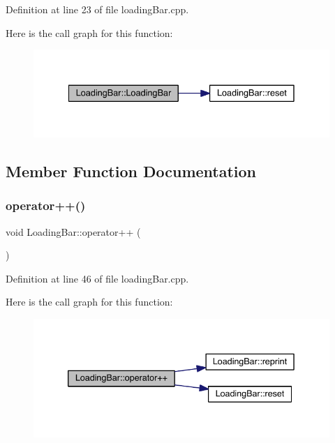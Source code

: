 Definition at line 23 of file loading\+Bar.\+cpp.

Here is the call graph for this function\+:\nopagebreak
\begin{figure}[H]
\begin{center}
\leavevmode
\includegraphics[width=335pt]{class_loading_bar_a0afe1dd48a942d6c5e55d7dfe81e3c68_cgraph}
\end{center}
\end{figure}


\subsection{Member Function Documentation}
\mbox{\label{class_loading_bar_a438e06db16611dd92962d8ebfbb1fe77}} 
\subsubsection{\texorpdfstring{operator++()}{operator++()}}
{\footnotesize\ttfamily void Loading\+Bar\+::operator++ (\begin{DoxyParamCaption}{ }\end{DoxyParamCaption})}



Definition at line 46 of file loading\+Bar.\+cpp.

Here is the call graph for this function\+:\nopagebreak
\begin{figure}[H]
\begin{center}
\leavevmode
\includegraphics[width=339pt]{class_loading_bar_a438e06db16611dd92962d8ebfbb1fe77_cgraph}
\end{center}
\end{figure}
\mbox{\label{class_loading_bar_ae9873c79a6760f8ca8d8eac56ff4d4f4}} 
